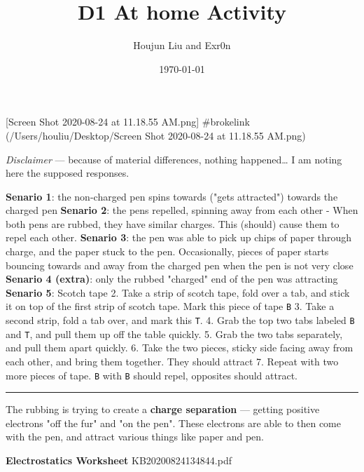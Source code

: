 \documentclass[letterpaper]{article}
\author{Houjun Liu and Exr0n}
\date{\today}
\title{D1 At home Activity}
\renewcommand{\tableofcontents}{}
\begin{document}
\tableofcontents

[Screen Shot 2020-08-24 at 11.18.55 AM.png] \#brokelink
(/Users/houliu/Desktop/Screen Shot 2020-08-24 at 11.18.55 AM.png)

\emph{Disclaimer} --- because of material differences, nothing happened\ldots{} I
am noting here the supposed responses.

\textbf{Senario 1}: the non-charged pen spins towards ("gets attracted")
towards the charged pen \textbf{Senario 2}: the pens repelled, spinning away
from each other - When both pens are rubbed, they have similar charges.
This (should) cause them to repel each other. \textbf{Senario 3}: the pen was
able to pick up chips of paper through charge, and the paper stuck to
the pen. Occasionally, pieces of paper starts bouncing towards and away
from the charged pen when the pen is not very close \textbf{Senario 4 (extra)}:
only the rubbed "charged" end of the pen was attracting \textbf{Senario 5}:
Scotch tape 2. Take a strip of scotch tape, fold over a tab, and stick
it on top of the first strip of scotch tape. Mark this piece of tape
\texttt{B} 3. Take a second strip, fold a tab over, and mark this \texttt{T}. 4. Grab
the top two tabs labeled \texttt{B} and \texttt{T}, and pull them up off the table
quickly. 5. Grab the two tabs separately, and pull them apart
quickly. 6. Take the two pieces, sticky side facing away from each
other, and bring them together. They should attract 7. Repeat with two
more pieces of tape. \texttt{B} with \texttt{B} should repel, opposites should
attract.

\noindent\rule{\textwidth}{0.5pt}

The rubbing is trying to create a \textbf{charge separation} --- getting
positive electrons "off the fur" and "on the pen". These electrons are
able to then come with the pen, and attract various things like paper
and pen.

\textbf{Electrostatics Worksheet} KB20200824134844.pdf
\end{document}
